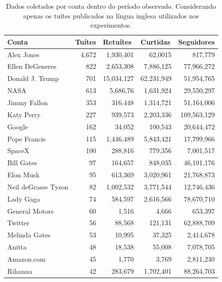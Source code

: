 \documentclass[oneside,openright,12pt]{ufsm_2015} %
\begin{document}
    \begin{table}[ht]
    \centering
    \caption{Dados coletados por conta dentro do período observado. Considerando apenas os tuítes publicados na língua inglesa utilizados nos experimentos.}
    \label{tab:todas-contas-tweets}
    \begin{tabular}{|l|r|r|r|r|}
    \hline
    \textbf{Conta}  & \multicolumn{1}{l|}{\textbf{Tuítes}} & \multicolumn{1}{l|}{\textbf{Retuítes}} & \multicolumn{1}{l|}{\textbf{Curtidas}} & \multicolumn{1}{l|}{\textbf{Seguidores}} \\ \hline
    Alex Jones 			& 4,672	& 1,930,401	& 62,0015	& 817,779 	    \\ \hline
    Ellen DeGeneres		& 822	& 2,653,308	& 7,886,125	& 77,966,272 	\\ \hline
    Donald J. Trump		& 701	& 15,034,127& 62,231,949& 51,954,765 	\\ \hline
    NASA				& 613	& 5,686,76	& 1,631,924	& 29,550,297 	\\ \hline
    Jimmy Fallon		& 353	& 316,448	& 1,314,721	& 51,164,006 	\\ \hline
    Katy Perry			& 227	& 939,573	& 2,203,336	& 109,563,129   \\ \hline
    Google				& 162	& 34,052	& 100,543	& 20,644,472 	\\ \hline
    Pope Francis		& 115	& 1,446,489	& 5,843,421	& 17,799,966 	\\ \hline
    SpaceX				& 100	& 288,816	& 779,356	& 7,001,517 	\\ \hline
    Bill Gates			& 97	& 164,657	& 848,035	& 46,101,176 	\\ \hline
    Elon Musk			& 95	& 613,369	& 3,020,961	& 21,768,873 	\\ \hline
    Neil deGrasse Tyson	& 82	& 1,002,532	& 3,771,544	& 12,746,436 	\\ \hline
    Lady Gaga			& 74	& 584,597	& 2,616,566	& 78,670,710 	\\ \hline
    General Motors		& 60	& 1,516		& 4,666		& 653,397 	    \\ \hline
    Twitter				& 56	& 88,568	& 121,131	& 62,888,709 	\\ \hline
    Melinda Gates		& 53	& 10,995	& 37,325	& 2,414,678 	\\ \hline
    Anitta				& 48	& 18,538	& 55,008	& 7,078,705 	\\ \hline
    Amazon.com			& 45	& 1,770		& 3,769		& 2,811,240 	\\ \hline
    Rihanna				& 42	& 283,679	& 1,702,401	& 88,264,703 	\\ \hline

\end{tabular}
\end{table}
\end{document}
